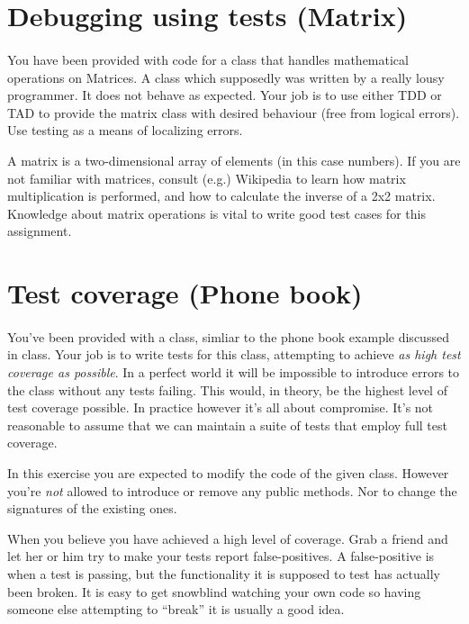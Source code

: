 \documentclass{article}
\begin{document}
  \pagebreak
  \section{ Debugging using tests (Matrix) }
    \paragraph{}
      You have been provided with code for a class that handles mathematical operations on Matrices. A class which supposedly was written by a really lousy programmer. It does not behave as expected. Your job is to use either TDD or TAD to provide the matrix class with desired behaviour (free from logical errors). Use testing as a means of localizing errors.

      A matrix is a two-dimensional array of elements (in this case numbers). If you are not familiar with matrices, consult (e.g.) Wikipedia to learn how matrix multiplication is performed, and how to calculate the inverse of a 2x2 matrix. Knowledge about matrix operations is vital to write good test cases for this assignment.






\pagebreak
\section{ Test coverage (Phone book) }
  \paragraph{}
    You've been provided with a class, simliar to the phone book example discussed in class. Your job is to write tests for this class, attempting to achieve \emph{as high test coverage as possible}. In a perfect world it will be impossible to introduce errors to the class without any tests failing. This would, in theory, be the highest level of test coverage possible. In practice however it's all about compromise. It's not reasonable to assume that we can maintain a suite of tests that employ full test coverage.

    In this exercise you are expected to modify the code of the given class. However you're \emph{not} allowed to introduce or remove any public methods. Nor to change the signatures of the existing ones.

    When you believe you have achieved a high level of coverage. Grab a friend and let her or him try to make your tests report false-positives. A false-positive is when a test is passing, but the functionality it is supposed to test has actually been broken. It is easy to get snowblind watching your own code so having someone else attempting to ``break'' it is usually a good idea.
\end{document}
